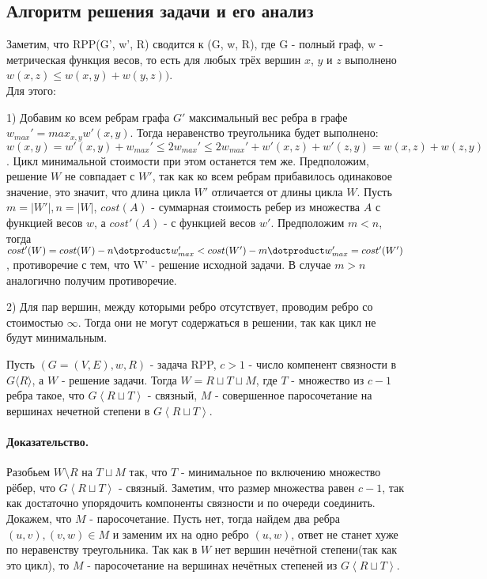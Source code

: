 \subsection{Алгоритм решения задачи и его анализ}

Заметим, что \textsf{RPP}(G', w', R) сводится к (G, w, R), где G - полный граф, w - метрическая функция весов, то есть для любых трёх вершин $x$, $y$ и $z$ выполнено $w(x, z) \leq w(x, y) + w(y, z))$. \\Для этого: \\
 \par1) Добавим ко всем ребрам графа $G'$ максимальный вес ребра в графе $w_{max}' = max_{x,y} w'(x, y)$. Тогда неравенство треугольника будет выполнено: $w(x, y) = w'(x, y) + w_{max}' \leq 2w_{max}' \leq 2w_{max}' + w'(x, z) + w'(z, y) = w(x, z) + w(z, y)$. Цикл минимальной стоимости при этом останется тем же. Предположим, решение $W$ не совпадает с $W'$, так как ко всем ребрам прибавилось одинаковое значение, это значит, что длина цикла $W'$ отличается от длины цикла $W$. Пусть $ m = |W'|, n =|W|$, $cost(A)$ - суммарная стоимость ребер из множества $A$ с функцией весов $w$, а $cost'(A)$ - с функцией весов $w'$. Предположим $m < n$, тогда 
$cost'(W) = cost(W) - n \dotproduct w_{max}' < cost(W') - m \dotproduct w_{max}' = cost'(W')$, противоречие с тем, что W' - решение исходной задачи. В случае $m > n$ аналогично получим противоречие.\\
\par2) Для пар вершин, между которыми ребро отсутствует, проводим ребро со стоимостью $\infty$. Тогда они не могут содержаться в решении, так как цикл не будут минимальным.

\begin{lemma}
Пусть $(G = (V, E), w, R)$ - задача \textsf{RPP}, $c > 1$ - число компенент связности в $G\langle R \rangle$, а $W$ - решение задачи. Тогда $W=R \sqcup T \sqcup M$, где  
$T$ - множество из $ c - 1$ ребра такое, что  $G \left\langle R \sqcup T \right\rangle$ - связный, 
$M$ - совершенное паросочетание на вершинах нечетной степени в $G \left\langle R \sqcup T \right\rangle$.

\end{lemma}
\paragraph{Доказательство.}
Разобьем $W \setminus R$ на $T \sqcup M$ так, что $T$ - минимальное по включению множество рёбер, что $G \left\langle R \sqcup T \right\rangle$ - связный. Заметим, что размер множества равен $c - 1$, так как достаточно упорядочить компоненты связности и по очереди соединить.  
Докажем, что $M$ - паросочетание. Пусть нет, тогда найдем два ребра $(u,v),(v,w) \in M$ и заменим их на одно ребро $(u, w)$, ответ не станет хуже по неравенству треугольника. Так как в $W$ нет вершин нечётной степени(так как это цикл), то $M$ - паросочетание на вершинах нечётных степеней из $G \left\langle R \sqcup T \right\rangle$.

